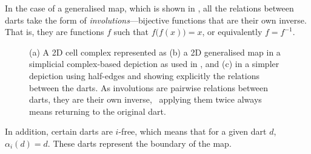 In the case of a generalised map, which is shown in , all the relations between darts take the form of \emph{involutions}---bijective functions that are their own inverse.
That is, they are functions $f$ such that $f\big(f(x)\big) = x$, or equivalently $f = f^{-1}$.
\begin{figure}[tbp]
\centering
{}
\quad
{}
\quad
{}
\caption[Involutions in a 2D generalised map]{(a) A 2D cell complex represented as (b) a 2D generalised map  in a simplicial complex-based depiction as used in , and (c) in a simpler depiction using half-edges and showing explicitly the relations between the darts.
As involutions are pairwise relations between darts, they are their own inverse, \ie\ applying them twice always means returning to the original dart.}
\label{fig:2dcc}
\end{figure}
In addition, certain darts are $i$-free, which means that for a given dart $d$, $\alpha_i(d) = d$.
These darts represent the boundary of the map.

